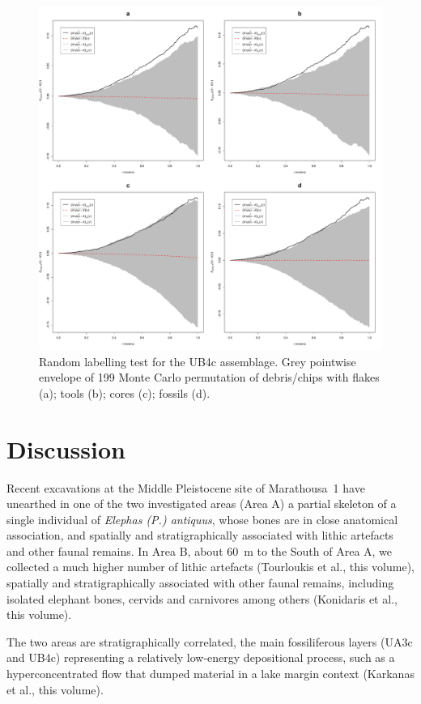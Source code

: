 \documentclass[review,authoryear,times]{elsarticle} %
\begin{document}
\begin{figure}[]
  \centering
  \includegraphics[width=1\textwidth]{../artwork/Fig11.pdf}
  \caption{Random labelling test for the UB4c assemblage. Grey pointwise envelope of 199 Monte Carlo permutation of debris/chips with flakes (a); tools (b); cores (c); fossils (d).}
  \label{fig:11}
\end{figure}

\section{Discussion}

Recent excavations at the Middle Pleistocene site of Marathousa~1 have unearthed in one of the two investigated areas (Area A) a partial skeleton of a single individual of \emph{Elephas (P.) antiquus}, whose bones are in close anatomical association, and spatially and stratigraphically associated with lithic artefacts and other faunal remains. In Area B, about 60~m to the South of Area A, we collected a much higher number of lithic artefacts (Tourloukis et al., this volume), spatially and stratigraphically associated with other faunal remains, including isolated elephant bones, cervids and carnivores among others (Konidaris et al., this volume).

The two areas are stratigraphically correlated, the main fossiliferous layers (UA3c and UB4c) representing a relatively low-energy depositional process, such as a hyperconcentrated flow that dumped material in a lake margin context (Karkanas et al., this volume).
\end{document}
